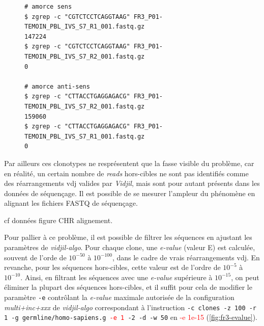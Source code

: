 \begin{figure}[H]
\begin{lstlisting}[language=custombash, 
    caption={Commande Bash et résultat de la recherche des séquences des amorces dans les fichiers FASTQ R1 et R2.},
    label={lst:bash-primer-r1-r2},
basicstyle=\ttfamily\small]
# amorce sens
$ zgrep -c "CGTCTCCTCAGGTAAG" FR3_P01-TEMOIN_PBL_IVS_S7_R1_001.fastq.gz
147224
$ zgrep -c "CGTCTCCTCAGGTAAG" FR3_P01-TEMOIN_PBL_IVS_S7_R2_001.fastq.gz
0

# amorce anti-sens
$ zgrep -c "CTTACCTGAGGAGACG" FR3_P01-TEMOIN_PBL_IVS_S7_R2_001.fastq.gz
159060
$ zgrep -c "CTTACCTGAGGAGACG" FR3_P01-TEMOIN_PBL_IVS_S7_R1_001.fastq.gz
0
\end{lstlisting}
\end{figure}
    
Par ailleurs ces clonotypes ne resprésentent que la fasse visible du problème, car en réalité, un certain nombre de \textit{reads} 
hors-cibles ne sont pas identifiés comme des réarrangements \gls{vdj} valides par \textit{Vidjil}, mais sont pour autant présents 
dans les données de séquençage. Il est possible de  se mesurer l'ampleur du phénomène en alignant les fichiers FASTQ de séquençage.

\vspace{1em}

cf données figure CHR alignement.

\vspace{1em}

Pour pallier à ce problème, il est possible de filtrer les séquences en ajustant les paramètres de \textit{vidjil-algo}.
Pour chaque clone, une \textit{e-value} (valeur E) est calculée, souvent de l'orde de $10^{-50}$ à $10^{-100}$, dans le 
cadre de vrais réarrangements \gls{vdj}. En revanche, pour les séquences hors-cibles, cette valeur est de l'ordre de $10^{-5}$ à $10^{-10}$. 
Ainsi, en filtrant les séquences avec une \textit{e-value} supérieure à $10^{-15}$, on peut éliminer la plupart des séquences hors-cibles, et 
il suffit pour cela de modifier le paramètre \texttt{-e} contrôlant la \textit{e-value} maximale autorisée de la configuration \textit{multi+inc+xxx} 
de \textit{vidjil-algo} correspondant à l'instruction \texttt{-c clones -z 100 -r 1 -g germline/homo-sapiens.g \textcolor{red}{-e 1} -2 -d -w 50} 
en \textcolor{red}{-e 1e-15} (\autoref{fig:fr3-evalue}).

